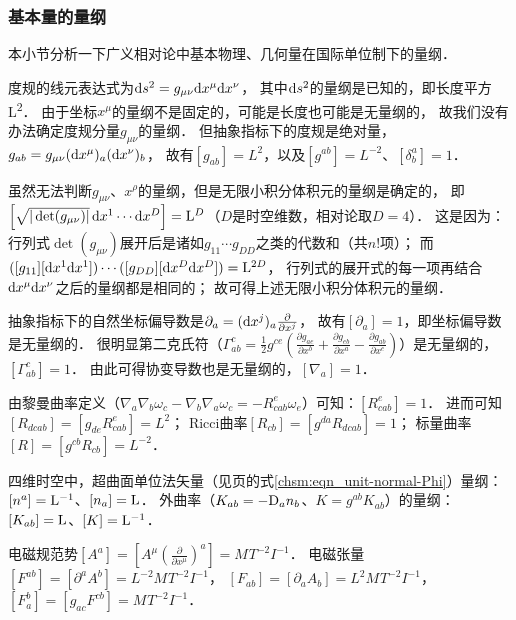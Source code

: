 \subsubsection{基本量的量纲}\label{chunit-dim:sec_basic-dim}
本小节分析一下广义相对论中基本物理、几何量在国际单位制下的量纲．

度规的线元表达式为${\rm d}s^2 = g_{\mu\nu} {\rm d}x^\mu {\rm d}x^\nu$，
其中${\rm d}s^2$的量纲是已知的，即长度平方\si{L^{2}}．
由于坐标$x^\mu$的量纲不是固定的，可能是长度也可能是无量纲的，
故我们没有办法确定度规分量$g_{\mu\nu}$的量纲．
但抽象指标下的度规是绝对量，$g_{ab}=g_{\mu\nu} ({\rm d}x^\mu)_a ({\rm d}x^\nu)_b$，
故有$[g_{ab}]=\si{L^{2}}$，以及$[g^{ab}]=\si{L^{-2}}$、$[\delta^{a}_b]=1$．

虽然无法判断$g_{\mu\nu}$、$x^\rho$的量纲，但是无限小积分体积元的量纲是确定的，
即$\left[\sqrt{|\det(g_{\mu\nu})|}\,{\rm d} x^1\cdots {\rm d} x^D\right]={\rm L}^D$（$D$是时空维数，相对论取$D=4$）．
这是因为：行列式$\det(g_{\mu\nu})$展开后是诸如$g_{11}\cdots g_{DD}$之类的代数和（共$n!$项）；
而$([g_{11}][{\rm d} x^1 {\rm d} x^1] )\cdots ([g_{DD}][{\rm d} x^D {\rm d} x^D] )= {\rm L}^{2D}$，
行列式的展开式的每一项再结合${\rm d} x^\mu {\rm d} x^\nu $之后的量纲都是相同的；
故可得上述无限小积分体积元的量纲．

抽象指标下的自然坐标偏导数是$\partial_a =({\rm d }x^j)_a \frac{\partial}{\partial x^j}$，
故有$[\partial_a]=1$，即坐标偏导数是无量纲的．
很明显第二克氏符（$\Gamma_{ab}^c = \frac{1}{2}{g^{ce}}\left( {\frac{{\partial {g_{ae}}}}{{\partial {x^b}}}
    + \frac{{\partial {g_{eb}}}}{{\partial {x^a}}}  - \frac{{\partial {g_{ab}}}}
    {{\partial {x^e}}}} \right)$）是无量纲的，$[\Gamma_{ab}^c]=1$．
由此可得协变导数也是无量纲的，$[\nabla_{a}]=1$．

由黎曼曲率定义（${\nabla_a}{\nabla_b}{\omega_c} - {\nabla_b}{\nabla_a}{\omega_c}
= -R_{cab}^e{\omega _e}$）可知：$[R_{cab}^e]=1$．
进而可知$[R_{dcab}]=[g_{de}R_{cab}^e]=\si{L^{2}}$；
Ricci曲率$[R_{cb}]=[g^{da}R_{dcab}]=1$；
标量曲率$[R]=[g^{cb}R_{cb}]=\si{L^{-2}}$．


四维时空中，超曲面单位法矢量（见\pageref{chsm:eqn_unit-normal-Phi}页的式\eqref{chsm:eqn_unit-normal-Phi}）量纲：
$[n^a]={\rm L}^{-1}$、$[n_a]={\rm L}$．
外曲率（$K_{ab} =- {\rm D}_a n_b$、$K = g^{ab} K_{ab}$）的量纲：
$[K_{ab}]={\rm L}$、$[K]={\rm L}^{-1}$．


电磁规范势$[A^a]=[A^\mu (\frac{\partial}{\partial x^\mu})^a]= \si{M^{}T^{-2}I^{-1}}$．
电磁张量$[F^{ab}]=[\partial^a A^b]=\si{L^{-2}M^{}T^{-2}I^{-1}}$，
$[F_{ab}]=[\partial_a A_b]=\si{L^{2}M^{}T^{-2}I^{-1}}$，
$[F_{a}^b]=[g_{ac} F^{cb}]=\si{M^{}T^{-2}I^{-1}}$．

